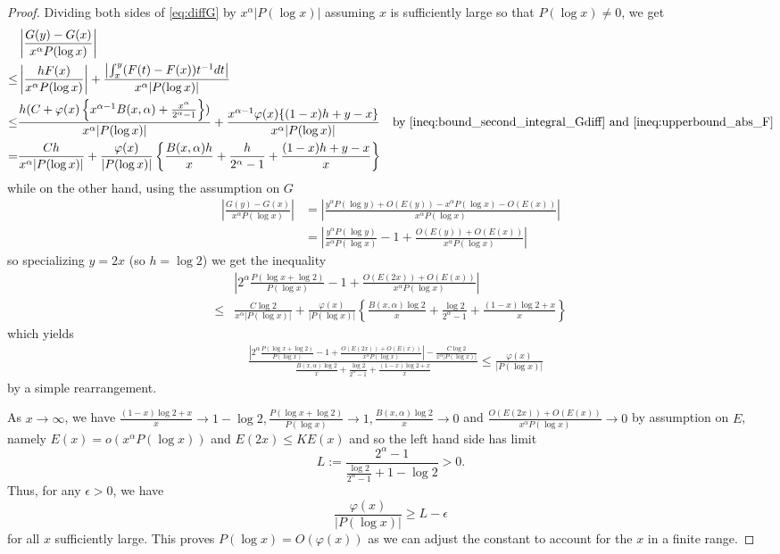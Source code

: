 \documentclass[12pt]{article}
\newcommand{\Abs}[1]{\left| #1 \right|}
\begin{document}
\begin{proof}
Dividing both sides of \eqref{eq:diffG} by $x^\alpha |P(\log x)|$ assuming $x$ is sufficiently large so that $P(\log x) \not= 0$, we get
\begin{align*}
&\Abs{\frac{G(y) - G(x)}{x^\alpha P(\log x)}}\\
\leq& \Abs{\frac{hF(x)}{x^\alpha P(\log x)}} + \frac{\Abs{\int_x^y (F(t) - F(x)) t^{-1} dt}}{x^\alpha |P(\log x)|}\\
\leq& \frac{h (C + \varphi(x) \left\{ x^{\alpha - 1} B(x, \alpha) + \frac{x^{\alpha}}{2^{\alpha} - 1}\right\})}{x^\alpha |P(\log x)|} + \frac{x^{\alpha - 1} \varphi(x) \{ (1 - x) h + y - x \}}{x^\alpha |P(\log x)|} &\text{by } \eqref{ineq:bound_second_integral_Gdiff} \text{ and } \eqref{ineq:upperbound_abs_F}\\
=& \frac{C h}{x^\alpha |P(\log x)|} + \frac{\varphi(x)}{|P(\log x)|} \left\{ \frac{B(x, \alpha) h}{x}  + \frac{h}{2^{\alpha} - 1} + \frac{(1 - x) h + y - x}{x}\right\}
\end{align*}
while on the other hand, using the assumption on $G$
\begin{align*}
\Abs{\frac{G(y) - G(x)}{x^\alpha P(\log x)}} &= \Abs{\frac{y^\alpha P(\log y) + O(E(y)) - x^\alpha P(\log x) - O(E(x))}{x^\alpha P(\log x)}}\\
&= \Abs{\frac{y^\alpha P(\log y)}{x^\alpha P(\log x)} - 1 + \frac{O(E(y)) + O(E(x))}{x^\alpha P(\log x)}}
\end{align*}
so specializing $y = 2x$ (so $h = \log 2$) we get the inequality
\begin{align*}
&\Abs{2^\alpha \frac{P(\log x + \log 2)}{P(\log x)} - 1 + \frac{O(E(2x)) + O(E(x))}{x^\alpha P(\log x)}} \\
\leq &\frac{C \log 2}{x^\alpha |P(\log x)|} + \frac{\varphi(x)}{|P(\log x)|} \left\{ \frac{B(x, \alpha) \log 2}{x}  + \frac{\log 2}{2^{\alpha} - 1} + \frac{(1 - x) \log 2 + x}{x}\right\}
\end{align*}
which yields
\begin{align*}
&\frac{\Abs{2^\alpha \frac{P(\log x + \log 2)}{P(\log x)} - 1 + \frac{O(E(2x)) + O(E(x))}{x^\alpha P(\log x)}} - \frac{C \log 2}{x^\alpha |P(\log x)|} }{\frac{B(x, \alpha) \log 2}{x}  + \frac{\log 2}{2^{\alpha} - 1} + \frac{(1 - x) \log 2 + x}{x}}\leq \frac{\varphi(x)}{|P(\log x)|} 
\end{align*}
by a simple rearrangement.

As $x \rightarrow \infty$, we have $\frac{(1 - x) \log 2 + x}{x} \rightarrow 1 - \log 2, \frac{P(\log x + \log 2)}{P(\log x)} \rightarrow 1, \frac{B(x, \alpha) \log 2}{x} \rightarrow 0$ and $\frac{O(E(2x)) + O(E(x))}{x^\alpha P(\log x)} \rightarrow 0$ by assumption on $E$, namely $E(x) = o(x^\alpha P(\log x))$ and $E(2x) \leq K E(x)$ and so the left hand side has limit
$$L := \frac{2^\alpha - 1}{\frac{\log 2}{2^\alpha - 1} + 1 - \log 2} > 0.$$
Thus, for any $\epsilon > 0$, we have
$$\frac{\varphi(x)}{|P(\log x)|} \geq L - \epsilon$$
for all $x$ sufficiently large. This proves $P(\log x) = O(\varphi(x))$ as we can adjust the constant to account for the $x$ in a finite range.


\end{proof}
\end{document}
